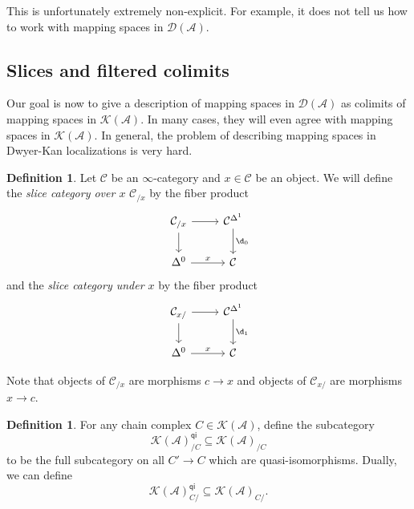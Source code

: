 \documentclass[10pt, oneside]{memoir}
\theoremstyle{definition}
\newtheorem{defn}[thm]{Definition}
\theoremstyle{remark}
\theoremstyle{plain}
\theoremstyle{definition}
\theoremstyle{remark}
\newcommand{\mc}[1]{\mathcal{#1}}
\newcommand{\ms}[1]{\mathsf{#1}}
\newcommand{\1}{\mathbf{1}}
\newcommand{\2}{\mathbf{2}}
\newcommand{\3}{\mathbf{3}}
\begin{document}
This is unfortunately extremely non-explicit. For example, it does not tell us how to work with mapping spaces in \(\mc{D}(\mc{A}) \).


\subsection{Slices and filtered colimits}%
\label{sub:Slices and filtered colimits}

Our goal is now to give a description of mapping spaces in \(\mc{D}(\mc{A}) \) as colimits of mapping spaces in \(\mc{K}(\mc{A}) \). In many cases, they will even agree with mapping spaces in \(\mc{K}(\mc{A}) \). In general, the problem of describing mapping spaces in Dwyer-Kan localizations is very hard.

\begin{defn}
    Let \(\mc{C} \) be an \(\infty \)-category and \(x \in \mc{C} \) be an object. We will define the \textit{slice category over \(x \)} \(\mc{C}_{/x} \) by the fiber product
    \begin{equation*}
    \begin{tikzcd}
        \mc{C}_{/x} \ar{r} \ar{d} & \mc{C}^{\Delta^1} \ar{d}{\d_0} \\
        \Delta^0 \ar{r}{x} & \mc{C}
    \end{tikzcd}
    \end{equation*}
    and the \textit{slice category under \(x \)} by the fiber product
    \begin{equation*}
        \begin{tikzcd}
            \mc{C}_{x/} \ar{r} \ar{d} & \mc{C}^{\Delta^1} \ar{d}{\d_1} \\
            \Delta^0 \ar{r}{x} & \mc{C}
        \end{tikzcd}
    \end{equation*}
\end{defn}

Note that objects of \(\mc{C}_{/x} \) are morphisms \(c \to x \) and objects of \(\mc{C}_{x/} \) are morphisms \(x \to c \).

\begin{defn}
    For any chain complex \(C \in \mc{K}(\mc{A}) \), define the subcategory
    \[ \mc{K}(\mc{A})_{/C}^{\ms{qi}} \subseteq \mc{K}(\mc{A})_{/C} \]
    to be the full subcategory on all \(C' \to C \) which are quasi-isomorphisms. Dually, we can define
    \[ \mc{K}(\mc{A})_{C/}^{\ms{qi}} \subseteq \mc{K}(\mc{A})_{C/}. \]
\end{defn}
\end{document}
